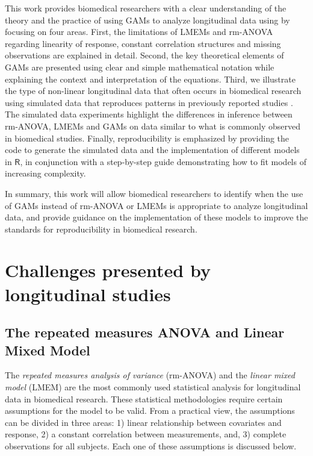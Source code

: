 \documentclass[Royal,times,doublespace,sagev]{sagej}
\begin{document}
This work provides biomedical researchers with a clear understanding of the theory and the practice of using GAMs to analyze longitudinal data using by focusing on four areas. First, the limitations of LMEMs and rm-ANOVA regarding linearity of response, constant correlation structures and missing observations are explained in detail. Second, the key theoretical elements of GAMs are presented using clear and simple mathematical notation while explaining the context and interpretation of the equations. Third, we illustrate the type of non-linear longitudinal data that often occurs in biomedical research using simulated data that reproduces patterns in previously reported studies \cite{vishwanath2009}. The simulated data experiments highlight the differences in inference between rm-ANOVA, LMEMs and GAMs on data similar to what is commonly observed in biomedical studies. Finally, reproducibility is emphasized by providing the code to generate the simulated data and the implementation of different models in \(\textsf{R}\), in conjunction with a step-by-step guide demonstrating how to fit models of increasing complexity.

In summary, this work will allow biomedical researchers to identify when the use of GAMs instead of rm-ANOVA or LMEMs is appropriate to analyze longitudinal data, and provide guidance on the implementation of these models to improve the standards for reproducibility in biomedical research.

\hypertarget{challenges-presented-by-longitudinal-studies}{%
\section{Challenges presented by longitudinal studies}\label{challenges-presented-by-longitudinal-studies}}

\hypertarget{the-repeated-measures-anova-and-linear-mixed-model}{%
\subsection{The repeated measures ANOVA and Linear Mixed Model}\label{the-repeated-measures-anova-and-linear-mixed-model}}

The \emph{repeated measures analysis of variance} (rm-ANOVA) and the \emph{linear mixed model} (LMEM) are the most commonly used statistical analysis for longitudinal data in biomedical research. These statistical methodologies require certain assumptions for the model to be valid. From a practical view, the assumptions can be divided in three areas: 1) linear relationship between covariates and response, 2) a constant correlation between measurements, and, 3) complete observations for all subjects. Each one of these assumptions is discussed below.
\end{document}
